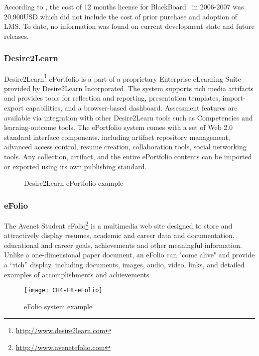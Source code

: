 According to \citet{Sweat-Guy2007}, the cost of 12 months license for
BlackBoard \ep~in 2006-2007 was 20,900USD which did not include the cost of
prior purchase and adoption of LMS. To date, no information was found on current
development state and future releases.

\subsubsection{Desire2Learn}
Desire2Learn\footnote{\url{http://www.desire2learn.com}} ePortfolio is a part of
a proprietary Enterprise eLearning Suite provided by Desire2Learn Incorporated.
The system supports rich media artifacts and provides tools for reflection and
reporting, presentation templates, import-export capabilities, and a
browser-based dashboard. Assessment features are available via integration with
other Desire2Learn tools such as Competencies and learning-outcome tools. The
ePortfolio system comes with a set of Web 2.0 standard interface components,
including artifact repository management, advanced access control, resume
creation, collaboration tools, social networking tools. Any collection,
artifact, and the entire ePortfolio contents can be imported or exported using
its own publishing standard.

\begin{figure}[htb]
\centering
\setlength\fboxsep{0pt}
\setlength\fboxrule{0.5pt}
\fbox{\texttt{[image: CH4-F7-D2L]}}
\caption[Desire2Learn ePortfolio example]{Desire2Learn ePortfolio example
\citep{Desire2LearnIncorporated2011}}
\label{fig:d2ep}
\end{figure}
 
\subsubsection{eFolio}

The Avenet Student eFolio\footnote{\url{http://www.avenetefolio.com}} is a
multimedia web site designed to store and attractively display resumes, academic
and career data and documentation, educational and career goals, achievements
and other meaningful information. Unlike a one-dimensional paper document, an
eFolio can "come alive" and provide a ``rich'' display, including documents,
images, audio, video, links, and detailed examples of accomplishments and
achievements.

\begin{figure}[htb]
\centering
\setlength\fboxsep{0pt}
\setlength\fboxrule{0.5pt}
\texttt{[image: CH4-F8-eFolio]}
\caption[eFolio system example]{eFolio system example \citep{EFolioMinnesota2011}}
\label{fig:efolio}
\end{figure}

